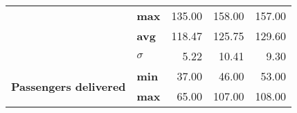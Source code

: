 \begin{table}[]
\begin{tabular}{llrrr}
                                               & \textbf{max}        & 135.00                                                                                                                                            & 158.00                                                                                                                                            & 157.00                                                                                                                                          \\
                                               & \textbf{avg}        & 118.47                                                                                                                                            & 125.75                                                                                                                                            & 129.60                                                                                                                                          \\
                                               & \textbf{$ \sigma $} & 5.22                                                                                                                                              & 10.41                                                                                                                                             & 9.30                                                                                                                                            \\ \hline
\multirow{4}{*}{\textbf{Passengers delivered}} & \textbf{min}        & 37.00                                                                                                                                             & 46.00                                                                                                                                             & 53.00                                                                                                                                           \\
                                               & \textbf{max}        & 65.00                                                                                                                                             & 107.00                                                                                                                                            & 108.00                                                                                                                                          \\

\end{tabular}
\end{table}
